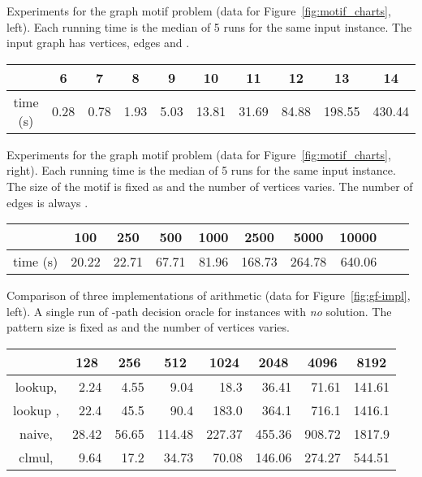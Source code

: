 \documentclass[11pt]{article}
\begin{document}
Experiments for the graph motif problem  (data for Figure~\ref{fig:motif_charts}, left).
Each running time is the median of 5 runs for the same input instance.
The input graph has  vertices,  edges and .

{\footnotesize
\begin{center}
\begin{tabular}{|c|r|r|r|r|r|r|r|r|r|}\hline
\multicolumn{1}{|c|}{} & \multicolumn{1}{|c|}{6}  & \multicolumn{1}{|c|}{7}  & \multicolumn{1}{|c|}{8}  & \multicolumn{1}{|c|}{9}  & \multicolumn{1}{|c|}{10}  & \multicolumn{1}{|c|}{11}  & \multicolumn{1}{|c|}{12}  & \multicolumn{1}{|c|}{13}  & \multicolumn{1}{|c|}{14} \\\hline
time (s) & 0.28 & 0.78 & 1.93 & 5.03 & 13.81 & 31.69 & 84.88 & 198.55 & 430.44\\\hline
\end{tabular}
\end{center}
}

Experiments for the graph motif problem  (data for Figure~\ref{fig:motif_charts}, right).
Each running time is the median of 5 runs for the same input instance.
The size of the motif is fixed as  and the number of vertices  varies. The number of edges is always .

{\footnotesize
\begin{center}
\begin{tabular}{|c|r|r|r|r|r|r|r|r|r|}\hline
\multicolumn{1}{|c|}{} & \multicolumn{1}{|c|}{100}  & \multicolumn{1}{|c|}{250}  & \multicolumn{1}{|c|}{500}  & \multicolumn{1}{|c|}{1000}  & \multicolumn{1}{|c|}{2500}  & \multicolumn{1}{|c|}{5000}  & \multicolumn{1}{|c|}{10000} \\\hline
time (s) & 20.22 & 22.71 & 67.71 & 81.96 & 168.73 & 264.78 & 640.06\\\hline
\end{tabular}
\end{center}
}
 

Comparison of three implementations of  arithmetic (data for Figure~\ref{fig:gf-impl}, left).
A single run of -path decision oracle for instances with {\em no} solution. 
The pattern size is fixed as  and the number of vertices  varies.

{\scriptsize
\begin{center}
\begin{tabular}{|c|r|r|r|r|r|r|r|}\hline
\multicolumn{1}{|c|}{} & \multicolumn{1}{|c|}{128}  & \multicolumn{1}{|c|}{256}  & \multicolumn{1}{|c|}{512}  & \multicolumn{1}{|c|}{1024}  & \multicolumn{1}{|c|}{2048}  & \multicolumn{1}{|c|}{4096}  & \multicolumn{1}{|c|}{8192} \\\hline
lookup,  & 2.24 & 4.55 & 9.04 & 18.3 & 36.41 & 71.61 & 141.61\\
lookup ,  & 22.4 & 45.5 & 90.4 & 183.0 & 364.1 & 716.1 & 1416.1\\
naive,  & 28.42 & 56.65 & 114.48 & 227.37 & 455.36 & 908.72 & 1817.9\\
clmul,  & 9.64 & 17.2 & 34.73 & 70.08 & 146.06 & 274.27 & 544.51\\\hline
\end{tabular}
\end{center}
}
\end{document}

